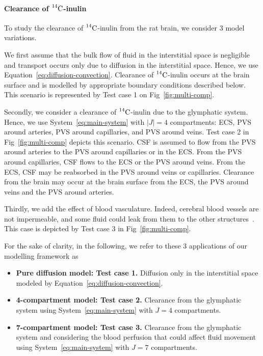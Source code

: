 \documentclass[a4paper,11pt]{article}
\newcommand{\1}{^{(1)}}
\newcommand{\2}{^{(2)}}
\newcommand{\abs}[1]{\left\lvert#1\right\rvert}
\newcommand{\Cinulin}{$\prescript{14}{}{\text{C}}$-inulin }
\begin{document}
\paragraph{Clearance of \Cinulin}
To study the clearance of \Cinulin from the rat brain, we consider $3$  model variations. 

We first assume that the bulk flow of fluid in the interstitial space is negligible and transport occurs only due to diffusion in the interstitial space. Hence, we use Equation~\eqref{eq:diffusion-convection}. Clearance of \Cinulin occurs at the brain surface and is modelled by appropriate boundary conditions described below. This scenario is represented by Test case 1 on Fig~\ref{fig:multi-comp}.

Secondly, we consider a clearance of \Cinulin due to the glymphatic system. Hence, we use System~\eqref{eq:main-system} with $\abs{J}=4$ compartments: ECS, PVS around arteries, PVS around capillaries, and PVS around veins. Test case 2 in Fig~\ref{fig:multi-comp} depicts this scenario. CSF is assumed to flow from the PVS around arteries to the PVS around capillaries or in the ECS. From the PVS around capillaries, CSF flows to the ECS or the PVS around veins. From the ECS, CSF may be reabsorbed in the PVS around veins or capillaries. Clearance from the brain may occur at the brain surface from the ECS, the PVS around veins and the PVS around arteries.

Thirdly, we add the effect of blood vasculature. Indeed, cerebral blood vessels are not impermeable, and some fluid could leak from them to the other structures~\cite{Oreskovic-2010-formation}. This case is depicted by Test case 3 in Fig~\ref{fig:multi-comp}. 

For the sake of clarity, in the following, we refer to these $3$ applications of our modelling framework as
\begin{itemize}
    \item \textbf{Pure diffusion model: Test case 1.} Diffusion only in the interstitial space modeled by Equation~\eqref{eq:diffusion-convection}. 
    \item \textbf{4-compartment model: Test case 2.} Clearance from the glymphatic system using System~\eqref{eq:main-system} with $J=4$ compartments. 
    \item \textbf{7-compartment model: Test case 3.} Clearance from the glymphatic system and considering the blood perfusion that could affect fluid movement using System~\eqref{eq:main-system} with $J=7$ compartments. 
\end{itemize}
\end{document}
